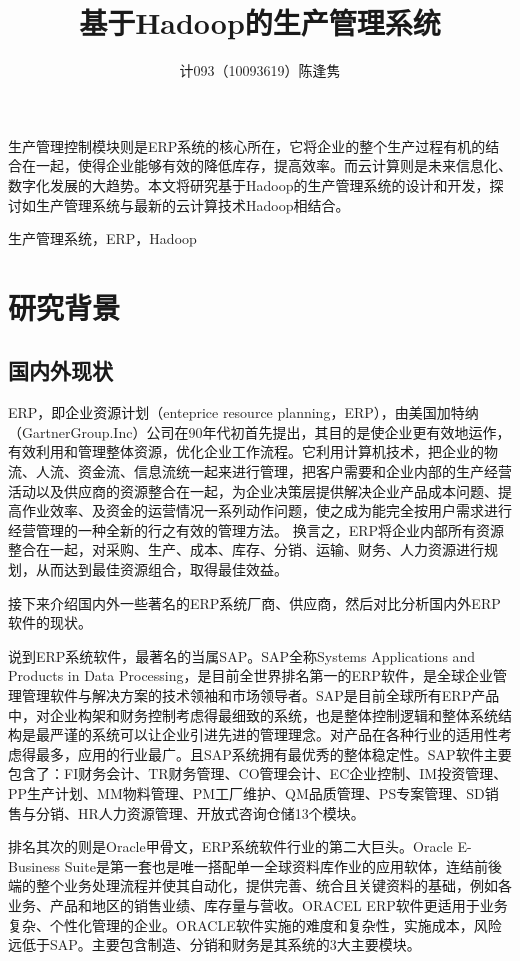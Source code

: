 \documentclass{Proposal}
\begin{document}
\title{基于Hadoop的生产管理系统}
\author{计093（10093619）陈逢隽}
\date{}
\maketitle
\thispagestyle{fancy}
\ECUSTabstract 生产管理控制模块则是ERP系统的核心所在，它将企业的整个生产过程有机的结合在一起，使得企业能够有效的降低库存，提高效率。而云计算则是未来信息化、数字化发展的大趋势。本文将研究基于Hadoop的生产管理系统的设计和开发，探讨如生产管理系统与最新的云计算技术Hadoop相结合。

\ECUSTkeywords 生产管理系统，ERP，Hadoop

\section{研究背景}

\subsection{国内外现状}

ERP，即企业资源计划（enteprice resource planning，ERP），由美国加特纳（GartnerGroup.Inc）公司在90年代初首先提出，其目的是使企业更有效地运作，有效利用和管理整体资源，优化企业工作流程。它利用计算机技术，把企业的物流、人流、资金流、信息流统一起来进行管理，把客户需要和企业内部的生产经营活动以及供应商的资源整合在一起，为企业决策层提供解决企业产品成本问题、提高作业效率、及资金的运营情况一系列动作问题，使之成为能完全按用户需求进行经营管理的一种全新的行之有效的管理方法。 换言之，ERP将企业内部所有资源整合在一起，对采购、生产、成本、库存、分销、运输、财务、人力资源进行规划，从而达到最佳资源组合，取得最佳效益。

接下来介绍国内外一些著名的ERP系统厂商、供应商，然后对比分析国内外ERP软件的现状。

说到ERP系统软件，最著名的当属SAP。SAP全称Systems Applications and Products in Data Processing，是目前全世界排名第一的ERP软件，是全球企业管理管理软件与解决方案的技术领袖和市场领导者。SAP是目前全球所有ERP产品中，对企业构架和财务控制考虑得最细致的系统，也是整体控制逻辑和整体系统结构是最严谨的系统可以让企业引进先进的管理理念。对产品在各种行业的适用性考虑得最多，应用的行业最广。且SAP系统拥有最优秀的整体稳定性。SAP软件主要包含了：FI财务会计、TR财务管理、CO管理会计、EC企业控制、IM投资管理、PP生产计划、MM物料管理、PM工厂维护、QM品质管理、PS专案管理、SD销售与分销、HR人力资源管理、开放式咨询仓储13个模块。

排名其次的则是Oracle甲骨文，ERP系统软件行业的第二大巨头。Oracle E-Business Suite是第一套也是唯一搭配单一全球资料库作业的应用软体，连结前後端的整个业务处理流程并使其自动化，提供完善、统合且关键资料的基础，例如各业务、产品和地区的销售业绩、库存量与营收。ORACEL ERP软件更适用于业务复杂、个性化管理的企业。ORACLE软件实施的难度和复杂性，实施成本，风险远低于SAP。主要包含制造、分销和财务是其系统的3大主要模块。
\end{document}

